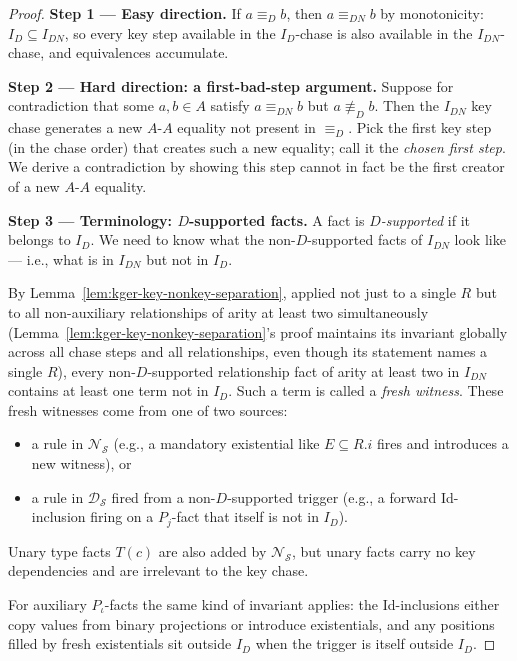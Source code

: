 \documentclass[10pt]{article}
\begin{document}
\begin{proof}

\smallskip\noindent\textbf{Step 1 --- Easy direction.}
If \(a\equiv_D b\), then \(a\equiv_{DN} b\) by monotonicity:
\(I_D\subseteq I_{DN}\), so every key step available in the
\(I_D\)-chase is also available in the \(I_{DN}\)-chase, and
equivalences accumulate.

\smallskip\noindent\textbf{Step 2 --- Hard direction: a first-bad-step
argument.}
Suppose for contradiction that some \(a,b\in A\) satisfy
\(a\equiv_{DN} b\) but \(a\not\equiv_D b\).  Then the \(I_{DN}\) key
chase generates a new \(A\)-\(A\) equality not present in \(\equiv_D\).
Pick the first key step (in the chase order) that creates such a new
equality; call it the \emph{chosen first step}.  We derive a
contradiction by showing this step cannot in fact be the first
creator of a new \(A\)-\(A\) equality.

\smallskip\noindent\textbf{Step 3 --- Terminology: \(D\)-supported facts.}
A fact is \emph{\(D\)-supported} if it belongs to \(I_D\).  We need to
know what the non-\(D\)-supported facts of \(I_{DN}\) look like ---
i.e., what is in \(I_{DN}\) but not in \(I_D\).

By Lemma~\ref{lem:kger-key-nonkey-separation}, applied not just to a
single \(R\) but to all non-auxiliary relationships of arity at least
two simultaneously (Lemma~\ref{lem:kger-key-nonkey-separation}'s proof
maintains its invariant globally across all chase steps and all
relationships, even though its statement names a single \(R\)), every
non-\(D\)-supported relationship fact of arity at least two in
\(I_{DN}\) contains at least one term not in \(I_D\).  Such a term is
called a \emph{fresh witness}.  These fresh witnesses come from one of
two sources:
\begin{itemize}
\item a rule in \(\mathcal N_{\mathcal S}\) (e.g., a mandatory
existential like \(E\subseteq R.i\) fires and introduces a new
witness), or
\item a rule in \(\mathcal D_{\mathcal S}\) fired from a
non-\(D\)-supported trigger (e.g., a forward Id-inclusion firing on a
\(P_j\)-fact that itself is not in \(I_D\)).
\end{itemize}
Unary type facts \(T(c)\) are also added by \(\mathcal N_{\mathcal S}\),
but unary facts carry no key dependencies and are irrelevant to the key
chase.

For auxiliary \(P_\iota\)-facts the same kind of invariant applies: the
Id-inclusions either copy values from binary projections or introduce
existentials, and any positions filled by fresh existentials sit
outside \(I_D\) when the trigger is itself outside \(I_D\).


\end{proof}
\end{document}
